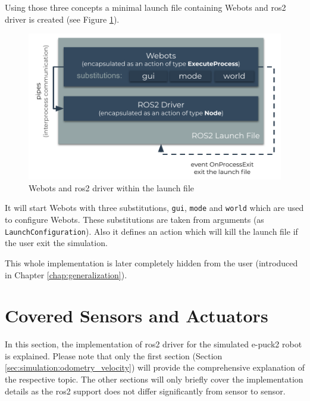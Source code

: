 Using those three concepts a minimal launch file containing Webots and \ac{ros2} driver is created (see Figure \ref{fig:simulation:webots_launch}).

\begin{figure}[H]
    \centering
    \includegraphics[width=\textwidth]{simulation/figures/webots_launch.pdf}
    \caption{Webots and \ac{ros2} driver within the launch file}
    \label{fig:simulation:webots_launch}
\end{figure}

It will start Webots with three substitutions, \texttt{gui}, \texttt{mode} and \texttt{world} which are used to configure Webots.
These substitutions are taken from arguments (as \texttt{LaunchConfiguration}).
Also it defines an action which will kill the launch file if the user exit the simulation.

This whole implementation is later completely hidden from the user (introduced in Chapter \ref{chap:generalization}).


\section{Covered Sensors and Actuators}

In this section, the implementation of \ac{ros2} driver for the simulated e-puck2 robot is explained.
Please note that only the first section (Section \ref{sec:simulation:odometry_velocity}) will provide the comprehensive explanation of the respective topic.
The other sections will only briefly cover the implementation details as the \ac{ros2} support does not differ significantly from sensor to sensor.

